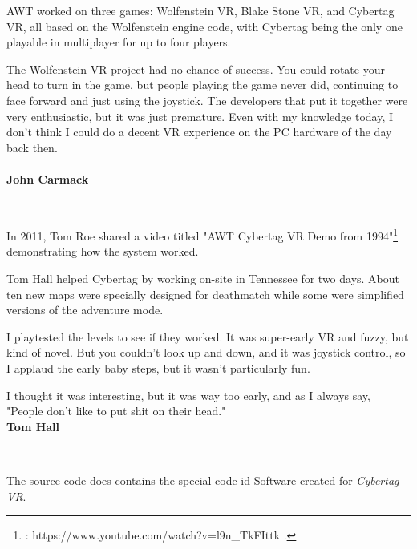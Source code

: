  AWT worked on three games: Wolfenstein VR, Blake Stone VR, and Cybertag VR, all based on the Wolfenstein engine code, with Cybertag being the only one playable in multiplayer for up to four players. \\
\par
\begin{fancyquotes}
The Wolfenstein VR project had no chance of success.  You could rotate your head to turn in the game, but people playing the game never did, continuing to face forward and just using the joystick.  The developers that put it together were very enthusiastic, but it was just premature.  Even with my knowledge today, I don't think I could do a decent VR experience on the PC hardware of the day back then.\\
\bigskip \\
\textbf{John Carmack}
 \end{fancyquotes}\\
\par
In 2011, Tom Roe shared a video titled "AWT Cybertag VR Demo from 1994"\footnote{: https://www.youtube.com/watch?v=l9n\_TkFIttk .} demonstrating how the system worked. 


\begin{figure}[H]
  \centering
 
\end{figure}

\begin{figure}[H]
  \centering
{}
\end{figure}

\begin{figure}[H]
  \centering
{}
\end{figure}

\begin{figure}[H]
  \centering
{}
 
\end{figure}
\par
Tom Hall helped Cybertag by working on-site in Tennessee for two days. About ten new maps were specially designed for deathmatch while some were simplified versions of the adventure mode.\\
\par
\begin{fancyquotes}
I playtested the levels to see if they worked. It was super-early VR and fuzzy, but kind of novel. But you couldn't look up and down, and it was joystick control, so I applaud the early baby steps, but it wasn't particularly fun.\\
\par

I thought it was interesting, but it was way too early, and as I always say, "People don't like to put shit on their head."
\bigskip \\
\textbf{Tom Hall}
 \end{fancyquotes}\\
\par
The source code does contains the special code id Software created for \textit{Cybertag VR}.\\
\par
{}

